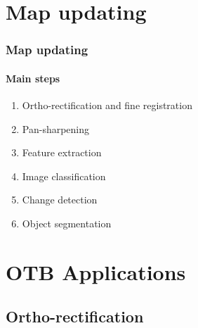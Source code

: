 \documentclass[compress]{beamer}
\begin{document}

\section{Map updating}
\begin{frame}
  \frametitle{Map updating}
  \framesubtitle{Main steps}
  \begin{enumerate}
    \item Ortho-rectification and fine registration
    \item Pan-sharpening
    \item Feature extraction
    \item Image classification
    \item Change detection
    \item Object segmentation
  \end{enumerate}
\end{frame}


\section{OTB Applications}
\subsection{Ortho-rectification}
\end{document}
